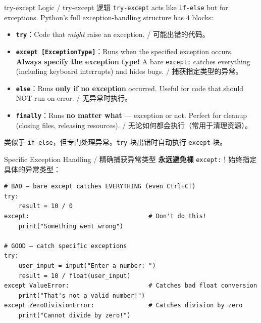 \documentclass[11pt,a4paper]{report}
\let\oldtexttt\texttt
\renewcommand{\texttt}[1]{\textcolor{mainblue}{\oldtexttt{#1}}}
\begin{document}
\begin{concept}{try-except Logic / try-except 逻辑}
    \texttt{try-except} acts like \texttt{if-else} but for exceptions. Python's full exception-handling structure has 4 blocks:
    \begin{itemize}[itemsep=0.5em]
        \item \textbf{\texttt{try}}：Code that \textit{might} raise an exception. / 可能出错的代码。
        \item \textbf{\texttt{except [ExceptionType]}}：Runs when the specified exception occurs. \textbf{Always specify the exception type!} A bare \texttt{except:} catches everything (including keyboard interrupts) and hides bugs. / 捕获指定类型的异常。
        \item \textbf{\texttt{else}}：Runs \textbf{only if no exception} occurred. Useful for code that should NOT run on error. / 无异常时执行。
        \item \textbf{\texttt{finally}}：Runs \textbf{no matter what} — exception or not. Perfect for cleanup (closing files, releasing resources). / 无论如何都会执行（常用于清理资源）。
    \end{itemize}
    类似于 \texttt{if-else}，但专门处理异常。\texttt{try} 块出错时自动执行 \texttt{except} 块。
\end{concept}

\begin{examplebox}{Specific Exception Handling / 精确捕获异常类型}
    \textbf{永远避免裸} \texttt{except:}！始终指定具体的异常类型：
\begin{lstlisting}
# BAD — bare except catches EVERYTHING (even Ctrl+C!)
try:
    result = 10 / 0
except:                                 # Don't do this!
    print("Something went wrong")

# GOOD — catch specific exceptions
try:
    user_input = input("Enter a number: ")
    result = 10 / float(user_input)
except ValueError:                      # Catches bad float conversion
    print("That's not a valid number!")
except ZeroDivisionError:               # Catches division by zero
    print("Cannot divide by zero!")
\end{lstlisting}
\end{examplebox}
\end{document}
